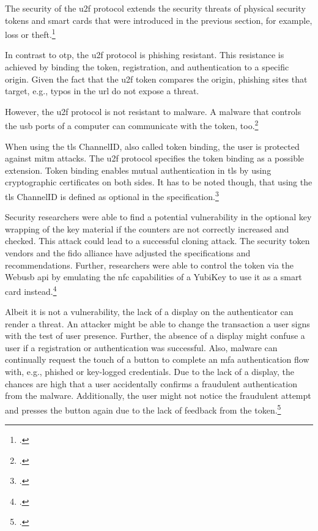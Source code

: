 The security of the \gls{u2f} protocol extends the security threats of physical security tokens and smart cards that were introduced in the previous section, for example, loss or theft.\footcites[See][12--13]{fido-sec-ref}

In contrast to \gls{otp}, the \gls{u2f} protocol is phishing resistant. This resistance is achieved by binding the token, registration, and authentication to a specific origin. Given the fact that the \gls{u2f} token compares the origin, phishing sites that target, e.g., typos in the \gls{url} do not expose a threat.

However, the \gls{u2f} protocol is not resistant to malware. A malware that controls the \gls{usb} ports of a computer can communicate with the token, too.\footcites[See][10--1]{8429292}[See][9]{u2f-overview}

When using the \gls{tls} ChannelID, also called token binding, the user is protected against \gls{mitm} attacks. The \gls{u2f} protocol specifies the token binding as a possible extension. Token binding enables mutual authentication in \gls{tls} by using cryptographic certificates on both sides. It has to be noted though, that using the \gls{tls} ChannelID is defined as optional in the specification.\footcites[See][6--7]{u2f-overview}

Security researchers were able to find a potential vulnerability in the optional key wrapping of the key material if the counters are not correctly increased and checked. This attack could lead to a successful cloning attack. The security token vendors and the \gls{fido} alliance have adjusted the specifications and recommendations. Further, researchers were able to control the token via the Web\gls{usb} \gls{api} by emulating the \gls{nfc} capabilities of a YubiKey to use it as a smart card instead.\footcites[See][3]{DBLP:journals/corr/abs-1906-06009}

Albeit it is not a vulnerability, the lack of a display on the authenticator can render a threat. An attacker might be able to change the transaction a user signs with the test of user presence. Further, the absence of a display might confuse a user if a registration or authentication was successful. Also, malware can continually request the touch of a button to complete an \gls{mfa} authentication flow with, e.g., phished or key-logged credentials. Due to the lack of a display, the chances are high that a user accidentally confirms a fraudulent authentication from the malware. Additionally, the user might not notice the fraudulent attempt and presses the button again due to the lack of feedback from the token.\footcites[See][434]{10.1007/978-3-662-54970-4_25}[See][15]{das2018johnny}[See][1518--1519]{238325}[See][884]{8418643}

